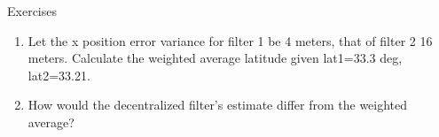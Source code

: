 \begin{frame}
Exercises
 \begin{enumerate}
 \item Let the x position error variance for filter 1 be 4 meters, that of filter 2 16 meters.  Calculate the weighted average latitude given lat1=33.3 deg, lat2=33.21.   
 \item How would the decentralized filter's estimate differ from the weighted average?
\end{enumerate}
\end{frame}
